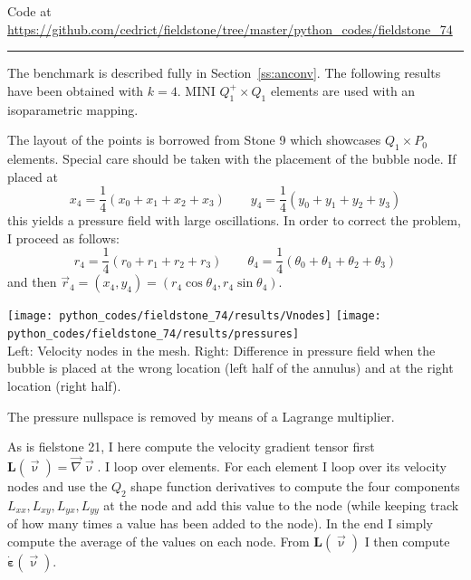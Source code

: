 


\begin{center}
Code at \url{https://github.com/cedrict/fieldstone/tree/master/python_codes/fieldstone_74}
\end{center}

\par\noindent\rule{\textwidth}{0.4pt}


The benchmark is described fully in Section~\ref{ss:anconv}. 
The following results have been obtained with $k=4$.
MINI $Q_1^+ \times Q_1$ elements are used with an isoparametric mapping. 

The layout of the points is borrowed from Stone 9 which 
showcases $Q_1 \times P_0$ elements. 
Special care should be taken with the placement of the bubble node.  
If placed at 
\[
x_4 = \frac{1}{4}(x_0+x_1+x_2+x_3)
\qquad
y_4 = \frac{1}{4}(y_0+y_1+y_2+y_3)
\]
this yields a pressure field with large oscillations. In order to correct the 
problem, I proceed as follows:
\[
r_4 = \frac{1}{4}(r_0+r_1+r_2+r_3)
\qquad
\theta_4 = \frac{1}{4}(\theta_0+\theta_1+\theta_2+\theta_3)
\]
and then $\vec{r}_4=(x_4,y_4)=(r_4 \cos\theta_4,r_4 \sin\theta_4)$.

\begin{center}
\texttt{[image: python\_codes/fieldstone\_74/results/Vnodes]}
\texttt{[image: python\_codes/fieldstone\_74/results/pressures]}\\
{\captionfont Left: Velocity nodes in the mesh. Right: 
Difference in pressure field when the bubble is placed
at the wrong location (left half of the annulus) and at the right location (right half).}
\end{center}


The pressure nullspace is removed by means of a Lagrange multiplier.

As is fielstone 21, I here compute the velocity gradient tensor first ${\bm L}(\vec\upnu)=\vec\nabla\vec\upnu$.
I loop over elements. For each element I loop over its velocity nodes and use the $Q_2$ 
shape function derivatives to compute the four components $L_{xx},L_{xy},L_{yx},L_{yy}$ at 
the node and add this value to the node (while keeping track of how many times a value
has been added to the node). In the end I simply compute the average of the values
on each node. From ${\bm L}(\vec\upnu)$ I then compute $\dot{\bm \varepsilon}(\vec\upnu)$. 


